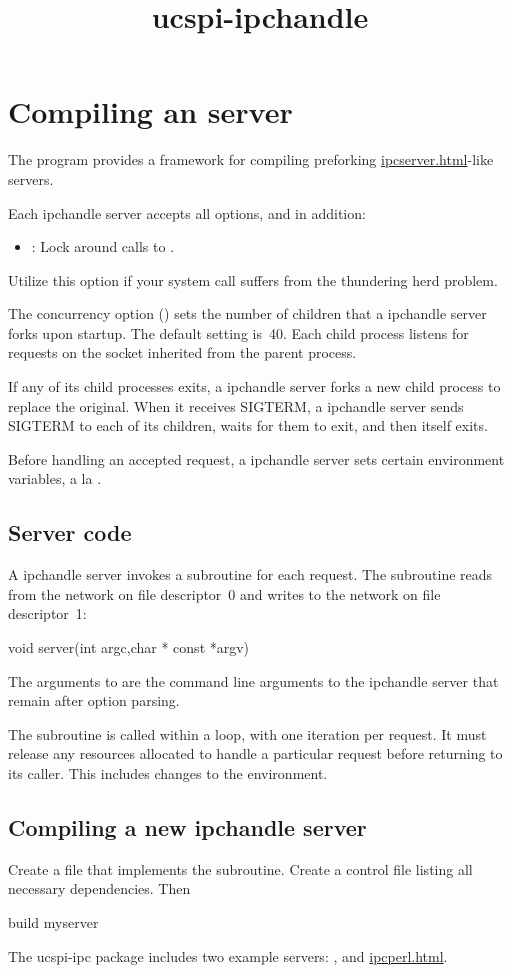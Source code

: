 \documentclass{book}
\title{ucspi-ipchandle}
\begin{document}
\section{Compiling an  server}

The  program provides a framework for compiling
preforking
\href{\cmd{ipcserver}}{ipcserver.html}-like servers.

Each ipchandle server accepts all  options, and
in addition:
\begin{itemize}
  \item {}:
    Lock  around calls to .
\end{itemize}
Utilize this option if your  system call suffers from the
thundering herd problem.

The concurrency option () sets the number of children that a
ipchandle server forks upon startup.  The default setting is~40.  Each
child process listens for requests on the socket inherited from the
parent process.

If any of its child processes exits, a ipchandle server forks a new
child process to replace the original.  When it receives SIGTERM, a
ipchandle server sends SIGTERM to each of its children, waits for them
to exit, and then itself exits.

Before handling an accepted request, a ipchandle server sets certain
environment variables, a la .

\subsection{Server code}
A ipchandle server invokes a  subroutine for each request.
The subroutine reads from the network on file descriptor~0 and writes to
the network on file descriptor~1:
\begin{code}%
  void server(int argc,char * const *argv)
\end{code}
The arguments to  are the command line arguments to the
ipchandle server that remain after option parsing.

The  subroutine is called within a loop, with one iteration
per request.  It must release any resources allocated to handle a
particular request before returning to its caller.  This includes
changes to the environment.

\subsection{Compiling a new ipchandle server}
Create a file  that implements the 
subroutine.  Create a control file  listing all
necessary dependencies.  Then
\begin{code}%
  build myserver
\end{code}

The ucspi-ipc package includes two example servers: , and
\href{\cmd{ipcperl}}{ipcperl.html}.
\end{document}
